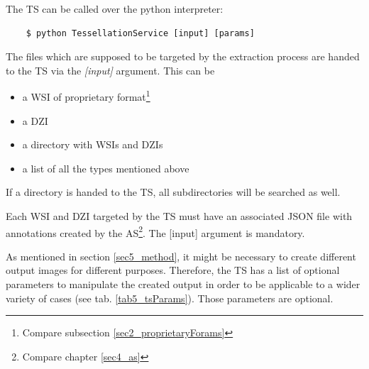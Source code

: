 The TS can be called over the python interpreter:

\begin{lstlisting}
	$ python TessellationService [input] [params]
\end{lstlisting}

The files which are supposed to be targeted by the extraction process are handed to the TS via the \emph{[input]} argument. This can be
\begin{itemize}
	\item a WSI of proprietary format\footnote{
		Compare subsection \ref{sec2_proprietaryForams}
	}
	\item a DZI
	\item a directory with WSIs and DZIs
	\item a list of all the types mentioned above
\end{itemize}

If a directory is handed to the TS, all subdirectories will be searched as well.

Each WSI and DZI targeted by the TS must have an associated JSON file with annotations created by the AS\footnote{
	Compare chapter \ref{sec4_as}
}. The [input] argument is mandatory.

As mentioned in section \ref{sec5_method}, it might be necessary to create different output images for different purposes. Therefore, the TS has a list of optional parameters to manipulate the created output in order to be applicable to a wider variety of cases (see tab. \ref{tab5_tsParams}). Those parameters are optional. 

